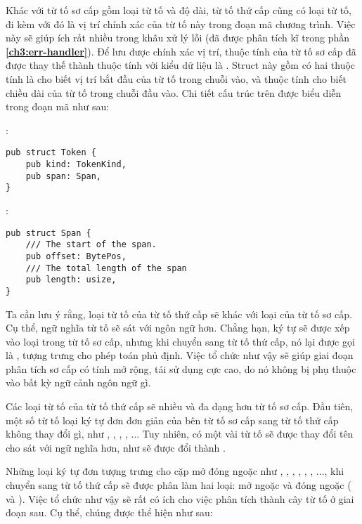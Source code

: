     Khác với từ tố sơ cấp gồm loại từ tố và độ dài, từ tố thứ cấp cũng có loại từ tố, đi kèm với đó là vị trí chính xác của từ tố này trong đoạn mã chương trình. Việc này sẽ giúp ích rất nhiều trong khâu xử lý lỗi (đã được phân tích kĩ trong phần \textbf{\ref{ch3:err-handler}}). Để lưu được chính xác vị trí, thuộc tính  của từ tố sơ cấp đã được thay thế thành thuộc tính  với kiểu dữ liệu là . Struct này gồm có hai thuộc tính là  cho biết vị trí bắt đầu của từ tố trong chuỗi vào, và thuộc tính  cho biết chiều dài của từ tố trong chuỗi đầu vào. Chi tiết cấu trúc trên được biểu diễn trong đoạn mã như sau:

\noindent {}:
\begin{lstlisting}
pub struct Token {
    pub kind: TokenKind,
    pub span: Span,
}
\end{lstlisting}

\noindent {}:
\begin{lstlisting}
pub struct Span {
    /// The start of the span.
    pub offset: BytePos,
    /// The total length of the span
    pub length: usize,
}
\end{lstlisting}

    Ta cần lưu ý rằng, loại từ tố của từ tố thứ cấp sẽ khác với loại của từ tố sơ cấp. Cụ thể, ngữ nghĩa từ tố sẽ sát với ngôn ngữ hơn. Chẳng hạn, ký tự \kw{!} sẽ được xếp vào loại  trong từ tố sơ cấp, nhưng khi chuyển sang từ tố thứ cấp, nó lại được gọi là , tượng trưng cho phép toán phủ định. Việc tổ chức như vậy sẽ giúp giai đoạn phân tích sơ cấp có tính mở rộng, tái sử dụng cực cao, do nó không bị phụ thuộc vào bất kỳ ngữ cảnh ngôn ngữ gì. 

    Các loại từ tố của từ tố thứ cấp sẽ nhiều và đa dạng hơn từ tố sơ cấp. Đầu tiên, một số từ tố loại ký tự đơn đơn giản của bên từ tố sơ cấp sang từ tố thứ cấp không thay đổi gì, như , , , , ... Tuy nhiên, có một vài từ tố sẽ được thay đổi tên cho sát với ngữ nghĩa hơn, như  sẽ được đổi thành . 

    Những loại ký tự đơn tượng trưng cho cặp mở đóng ngoặc như , , , , \kw{`[`}, \kw{`]`}, ..., khi chuyển sang từ tố thứ cấp sẽ được phân làm hai loại: mở ngoặc và đóng ngoặc ( và ). Việc tổ chức như vậy sẽ rất có ích cho việc phân tích thành cây từ tố ở giai đoạn sau. Cụ thể, chúng được thể hiện như sau:

